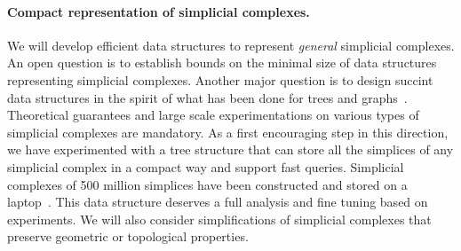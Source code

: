 \paragraph{Compact representation of simplicial complexes.}  We will develop efficient data structures to represent {\em general} simplicial complexes. 
An open question is to establish bounds on the minimal size of data structures representing simplicial complexes. Another major question is to design succint data structures
in the spirit of what has been done for trees and graphs~\cite{Ferragina:2005:SLT:1097112.1097456,Munro:2002:SRB:586840.586885}. 
 Theoretical guarantees and large scale experimentations on various types of simplicial complexes are mandatory. As a first encouraging step in this direction, we have experimented with a tree structure that can store all the simplices of any simplicial complex in a compact way and support fast queries. Simplicial complexes of 500 million simplices have been constructed and stored on a laptop~\cite{bm-dssc-2012}. 
This data structure deserves a full analysis and fine tuning based on experiments.
We will also consider simplifications of simplicial complexes that preserve geometric or topological properties.










